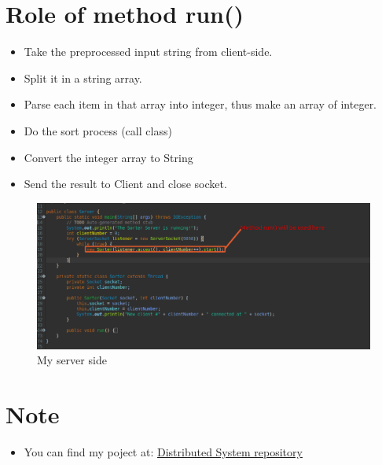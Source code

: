 \documentclass[11pt,a4paper]{article}
\begin{document}
	\section{Role of method run()}
	\begin{itemize}
		\item Take the preprocessed input string from client-side.
		\item Split it in a string array.
		\item Parse each item in that array into integer, thus make an array of integer.
		\item Do the sort process (call class)
		\item Convert the integer array to String
		\item Send the result to Client and close socket.
	\end{itemize}
	\begin{figure}[h!]
  		\includegraphics[width=\linewidth]{server-code.png}
  		\caption{My server side}
  		\label{fig:server}
	\end{figure}
	\section{Note}
	\begin{itemize}
		\item You can find my poject at: \href{https://github.com/lam1910/DistributedSystem}{Distributed System repository}
	\end{itemize}
\end{document}
